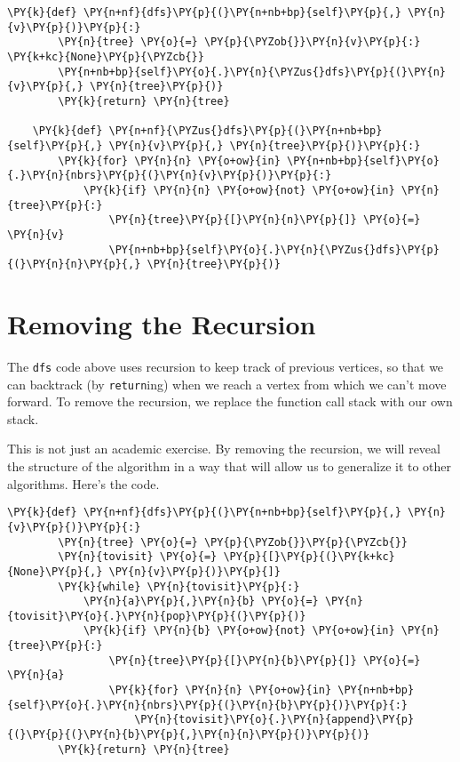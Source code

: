 \begin{Verbatim}[commandchars=\\\{\}]
    \PY{k}{def} \PY{n+nf}{dfs}\PY{p}{(}\PY{n+nb+bp}{self}\PY{p}{,} \PY{n}{v}\PY{p}{)}\PY{p}{:}
        \PY{n}{tree} \PY{o}{=} \PY{p}{\PYZob{}}\PY{n}{v}\PY{p}{:} \PY{k+kc}{None}\PY{p}{\PYZcb{}}
        \PY{n+nb+bp}{self}\PY{o}{.}\PY{n}{\PYZus{}dfs}\PY{p}{(}\PY{n}{v}\PY{p}{,} \PY{n}{tree}\PY{p}{)}
        \PY{k}{return} \PY{n}{tree}

    \PY{k}{def} \PY{n+nf}{\PYZus{}dfs}\PY{p}{(}\PY{n+nb+bp}{self}\PY{p}{,} \PY{n}{v}\PY{p}{,} \PY{n}{tree}\PY{p}{)}\PY{p}{:}
        \PY{k}{for} \PY{n}{n} \PY{o+ow}{in} \PY{n+nb+bp}{self}\PY{o}{.}\PY{n}{nbrs}\PY{p}{(}\PY{n}{v}\PY{p}{)}\PY{p}{:}
            \PY{k}{if} \PY{n}{n} \PY{o+ow}{not} \PY{o+ow}{in} \PY{n}{tree}\PY{p}{:}
                \PY{n}{tree}\PY{p}{[}\PY{n}{n}\PY{p}{]} \PY{o}{=} \PY{n}{v}
                \PY{n+nb+bp}{self}\PY{o}{.}\PY{n}{\PYZus{}dfs}\PY{p}{(}\PY{n}{n}\PY{p}{,} \PY{n}{tree}\PY{p}{)}
\end{Verbatim}


\section{Removing the Recursion}


The \texttt{dfs} code above uses recursion to keep track of previous vertices, so that we can backtrack (by \texttt{return}ing) when we reach a vertex from which we can't move forward.
To remove the recursion, we replace the function call stack with our own stack.


This is not just an academic exercise.
By removing the recursion, we will reveal the structure of the algorithm in a way that will allow us to generalize it to other algorithms.
Here's the code.

\begin{Verbatim}[commandchars=\\\{\}]
    \PY{k}{def} \PY{n+nf}{dfs}\PY{p}{(}\PY{n+nb+bp}{self}\PY{p}{,} \PY{n}{v}\PY{p}{)}\PY{p}{:}
        \PY{n}{tree} \PY{o}{=} \PY{p}{\PYZob{}}\PY{p}{\PYZcb{}}
        \PY{n}{tovisit} \PY{o}{=} \PY{p}{[}\PY{p}{(}\PY{k+kc}{None}\PY{p}{,} \PY{n}{v}\PY{p}{)}\PY{p}{]}
        \PY{k}{while} \PY{n}{tovisit}\PY{p}{:}
            \PY{n}{a}\PY{p}{,}\PY{n}{b} \PY{o}{=} \PY{n}{tovisit}\PY{o}{.}\PY{n}{pop}\PY{p}{(}\PY{p}{)}
            \PY{k}{if} \PY{n}{b} \PY{o+ow}{not} \PY{o+ow}{in} \PY{n}{tree}\PY{p}{:}
                \PY{n}{tree}\PY{p}{[}\PY{n}{b}\PY{p}{]} \PY{o}{=} \PY{n}{a}
                \PY{k}{for} \PY{n}{n} \PY{o+ow}{in} \PY{n+nb+bp}{self}\PY{o}{.}\PY{n}{nbrs}\PY{p}{(}\PY{n}{b}\PY{p}{)}\PY{p}{:}
                    \PY{n}{tovisit}\PY{o}{.}\PY{n}{append}\PY{p}{(}\PY{p}{(}\PY{n}{b}\PY{p}{,}\PY{n}{n}\PY{p}{)}\PY{p}{)}
        \PY{k}{return} \PY{n}{tree}
\end{Verbatim}


